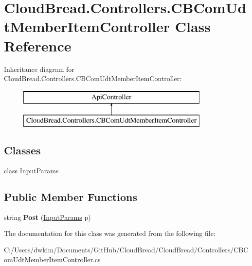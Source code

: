 \hypertarget{class_cloud_bread_1_1_controllers_1_1_c_b_com_udt_member_item_controller}{}\section{Cloud\+Bread.\+Controllers.\+C\+B\+Com\+Udt\+Member\+Item\+Controller Class Reference}
\label{class_cloud_bread_1_1_controllers_1_1_c_b_com_udt_member_item_controller}
Inheritance diagram for Cloud\+Bread.\+Controllers.\+C\+B\+Com\+Udt\+Member\+Item\+Controller\+:\begin{figure}[H]
\begin{center}
\leavevmode
\includegraphics[height=2.000000cm]{class_cloud_bread_1_1_controllers_1_1_c_b_com_udt_member_item_controller}
\end{center}
\end{figure}
\subsection*{Classes}
\begin{DoxyCompactItemize}
\item 
class \hyperlink{class_cloud_bread_1_1_controllers_1_1_c_b_com_udt_member_item_controller_1_1_input_params}{Input\+Params}
\end{DoxyCompactItemize}
\subsection*{Public Member Functions}
\begin{DoxyCompactItemize}
\item 
string {\bfseries Post} (\hyperlink{class_cloud_bread_1_1_controllers_1_1_c_b_com_udt_member_item_controller_1_1_input_params}{Input\+Params} p)\hypertarget{class_cloud_bread_1_1_controllers_1_1_c_b_com_udt_member_item_controller_a5696e47c8f195bbcaa64a1a89540af94}{}\label{class_cloud_bread_1_1_controllers_1_1_c_b_com_udt_member_item_controller_a5696e47c8f195bbcaa64a1a89540af94}

\end{DoxyCompactItemize}


The documentation for this class was generated from the following file\+:\begin{DoxyCompactItemize}
\item 
C\+:/\+Users/dwkim/\+Documents/\+Git\+Hub/\+Cloud\+Bread/\+Cloud\+Bread/\+Controllers/C\+B\+Com\+Udt\+Member\+Item\+Controller.\+cs\end{DoxyCompactItemize}
